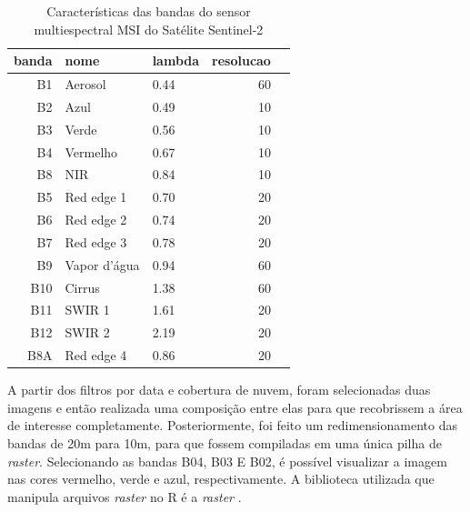 \begin{table}[ht]
\centering
\caption{Características das bandas do sensor multiespectral MSI do Satélite Sentinel-2}
\begin{tabular}{rllrr}
  \hline
 banda & nome & lambda & resolucao \\ 
  \hline
 B1 & Aerosol & 0.44 &  60 \\ 
 B2 & Azul & 0.49 &  10 \\ 
 B3 & Verde & 0.56 &  10 \\ 
 B4 & Vermelho & 0.67 &  10 \\ 
 B8 & NIR & 0.84 &  10 \\ 
 B5 & Red edge 1 & 0.70 &  20 \\ 
 B6 & Red edge 2 & 0.74 &  20 \\ 
 B7 & Red edge 3 & 0.78 &  20 \\ 
 B9 & Vapor d’água & 0.94 &  60 \\ 
 B10 & Cirrus & 1.38 &  60 \\ 
 B11 & SWIR 1 & 1.61 &  20 \\ 
 B12 & SWIR 2 & 2.19 &  20 \\ 
 B8A & Red edge 4 & 0.86 &  20 \\ 
   \hline
\end{tabular}
\label{t.sentinel-msi}
\end{table}

A partir dos filtros por data e cobertura de nuvem, foram selecionadas duas imagens e então realizada uma composição entre elas para que recobrissem a área de interesse completamente. Posteriormente, foi feito um redimensionamento das bandas de 20m para 10m, para que fossem compiladas em uma única pilha de \textit{raster}. Selecionando as bandas B04, B03 E B02, é possível visualizar a imagem nas cores vermelho, verde e azul, respectivamente. A biblioteca utilizada que manipula arquivos \textit{raster} no R é a \textit{raster} \cite{raster}.

